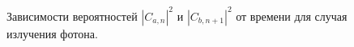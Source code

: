 \begin{figure}
\centering



\caption{Зависимости вероятностей $\left|C_{a, n}\right|^2$ и
  $\left|C_{b, n+1}\right|^2$ от времени для случая излучения фотона.}
\label{figPart1Ch2_5}
\end{figure}

